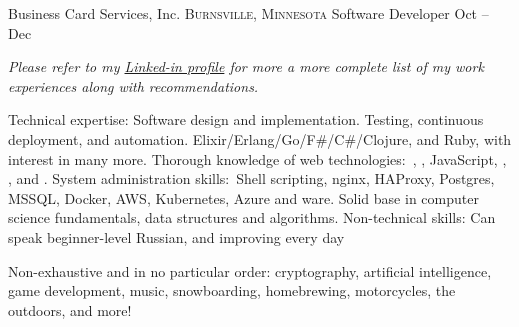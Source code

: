 \documentclass[10pt,a4paper]{article}
\begin{document}
\headedsection
  {Business Card Services, Inc.}
  {\textsc{Burnsville, Minnesota}} {%
  \headedsubsection
    {Software Developer}
    {Oct  -- Dec }
    {}
}


\vspace{-0.2em}
\begin{center}
  \emph{\small Please refer to my \href{http://www.linkedin.com/in/gotbones}{Linked-in profile} for more a more complete list of my work experiences along with recommendations.}
\end{center}


\spacedhrule{-0.2em}{-0.4em}


\inlineheadsection  %
  {Technical expertise:}
  {Software design and implementation. Testing, continuous deployment, and automation. Elixir/\nsp Erlang/\nsp Go/\nsp F\#/\nsp C\#/\nsp Clojure, and Ruby, with interest in many more. Thorough knowledge of web technologies:\ , , JavaScript, , , and . System administration skills:\ Shell scripting, nginx, HAProxy, Postgres, MSSQL, Docker, AWS, Kubernetes, Azure and ware. Solid base in computer science fundamentals, data structures and algorithms.}
\inlineheadsection
  {Non-technical skills:}
  {Can speak beginner-level Russian, and improving every day}


\inlineheadsection
  {Non-exhaustive and in no particular order:}
  {cryptography, artificial intelligence, game development, music, snowboarding, homebrewing, motorcycles, the outdoors, and more!}
\end{document}
